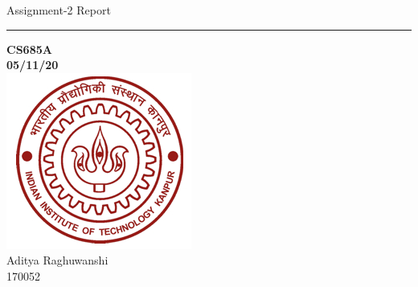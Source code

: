 \documentclass[12pt]{article}
\begin{document}
	\begin{center}
	{\LARGE{Assignment-2 Report}}\\
	\hrule	
	{\LARGE\textbf{CS685A}}\\
	\vspace{10pt}
	{\LARGE\textbf{05/11/20}}\\
	\includegraphics{iitk.jpg}\\
	\vspace{15pt}
	{\LARGE{Aditya Raghuwanshi}}\\
	{\LARGE{170052}}\\
\end{center}
\newpage


	
\end{document}
